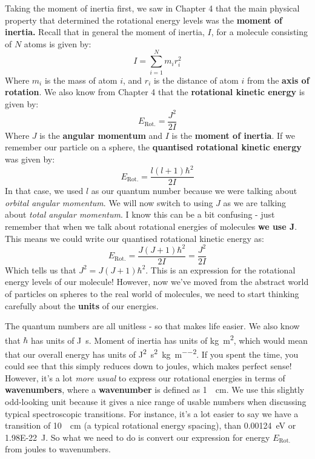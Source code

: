\documentclass{memoir}[11pt,oneside,a4paper,openany]
\begin{document}
Taking the moment of inertia first, we saw in Chapter 4 that the main physical property that determined the rotational energy levels was the \textbf{moment of inertia.} Recall that in general the moment of inertia, $I$, for a molecule consisting of $N$ atoms is given by:
\begin{equation}
	I = \sum_{i=1}^N m_ir_i^2
\end{equation}
Where $m_i$ is the mass of atom $i$, and $r_i$ is the distance of atom $i$ from the \textbf{axis of rotation}. We also know from Chapter 4 that the \textbf{rotational kinetic energy} is given by:
\begin{equation}
	E_{\text{Rot.}} = \frac{J^2}{2I}
\end{equation}
Where $J$ is the \textbf{angular momentum} and $I$ is the \textbf{moment of inertia}. If we remember our particle on a sphere, the \textbf{quantised rotational kinetic energy} was given by:
\begin{equation}
	E_{\text{Rot.}} = \frac{l(l+1)\hbar^2}{2I}
\end{equation}
In that case, we used $l$ as our quantum number because we were talking about \emph{orbital angular momentum}. We will now switch to using $J$ as we are talking about \emph{total angular momentum}. I know this can be a bit confusing - just remember that when we talk about rotational energies of molecules \textbf{we use J}. This means we could write our quantised rotational kinetic energy as:
\begin{equation}
	E_{\text{Rot.}} = \frac{J(J+1)\hbar^2}{2I} = \frac{J^2}{2I}
\end{equation}
Which tells us that $J^2 = J(J+1)\hbar^2$. This is an expression for the rotational energy levels of our molecule! However, now we've moved from the abstract world of particles on spheres to the real world of molecules, we need to start thinking carefully about the \textbf{units} of our energies. 

The quantum numbers are all unitless - so that makes life easier. We also know that $\hbar$ has units of \si{\joule\second}. Moment of inertia has units of \si{\kilo\gram\metre\squared}, which would mean that our overall energy has units of \si{\joule\squared\second\squared\per\kilo\gram\per\metre\squared}. If you spent the time, you could see that this simply reduces down to joules, which makes perfect sense! However, it's a lot \emph{more usual} to express our rotational energies in terms of \textbf{wavenumbers}, where a \textbf{wavenumber} is defined as \SI{1}{\per\centi\metre}. We use this slightly odd-looking unit because it gives a nice range of usable numbers when discussing typical spectroscopic transitions. For instance, it's a lot easier to say we have a transition of \SI{10}{\per\centi\metre} (a typical rotational energy spacing), than \SI{0.00124}{\electronvolt} or \SI{1.98E-22}{\joule}. So what we need to do is convert our expression for energy $E_{\text{Rot.}}$ from joules to wavenumbers.
\end{document}
